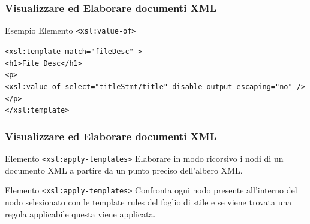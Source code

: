 \begin{frame}
    \frametitle{Visualizzare ed Elaborare documenti XML}
    \addtocounter{nframe}{1}
    

     \begin{block}{Esempio Elemento \texttt{<xsl:value-of>}}
        
        \texttt{<xsl:template match="fileDesc" >}
        \\\texttt{<h1>File Desc</h1>}
        \\\texttt{<p>}
            \\\texttt{<xsl:value-of select="titleStmt/title" disable-output-escaping="no" />}
        \\\texttt{</p>}
        \\\texttt{</xsl:template>}

     \end{block}
    
\end{frame}


\begin{frame}
    \frametitle{Visualizzare ed Elaborare documenti XML}
    \addtocounter{nframe}{1}
    

     \begin{block}{Elemento \texttt{<xsl:apply-templates>}}
        Elaborare in modo ricorsivo i nodi di un documento XML a partire da un punto preciso dell'albero XML.
     \end{block}

     \begin{block}{Elemento \texttt{<xsl:apply-templates>}}
        Confronta ogni nodo presente all’interno del nodo selezionato con le template rules del foglio di stile e se viene trovata una regola applicabile questa viene applicata.
     \end{block}

\end{frame}

